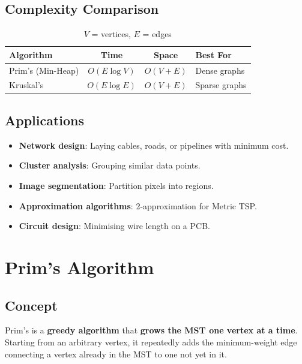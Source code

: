 \documentclass[12pt,a4paper]{article}
\begin{document}
\subsection{Complexity Comparison}
\begin{table}[h!]
\centering
\renewcommand{\arraystretch}{1.4}
\begin{tabular}{|l|c|c|l|}
\hline
\textbf{Algorithm} & \textbf{Time} & \textbf{Space} & \textbf{Best For} \\
\hline
Prim's (Min-Heap)  & $O(E \log V)$ & $O(V + E)$     & Dense graphs \\
Kruskal's          & $O(E \log E)$ & $O(V + E)$     & Sparse graphs \\
\hline
\end{tabular}
\caption{$V$ = vertices, $E$ = edges}
\end{table}

\subsection{Applications}
\begin{itemize}
    \item \textbf{Network design}: Laying cables, roads, or pipelines with minimum cost.
    \item \textbf{Cluster analysis}: Grouping similar data points.
    \item \textbf{Image segmentation}: Partition pixels into regions.
    \item \textbf{Approximation algorithms}: 2-approximation for Metric TSP.
    \item \textbf{Circuit design}: Minimising wire length on a PCB.
\end{itemize}

\newpage

\section{Prim's Algorithm}

\subsection{Concept}
Prim's is a \textbf{greedy algorithm} that \textbf{grows the MST one vertex at a time}. Starting from an arbitrary vertex, it repeatedly adds the minimum-weight edge connecting a vertex already in the MST to one not yet in it.
\end{document}
